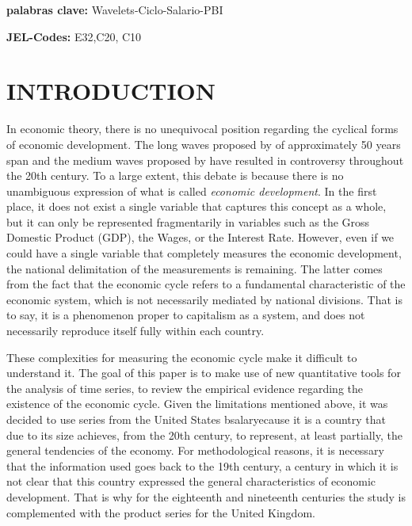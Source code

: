 \documentclass[a4paper,10cpi]{article}
\begin{document}
	
	\textbf{palabras clave:} Wavelets-Ciclo-Salario-PBI
	
	\textbf{JEL-Codes:} E32,C20, C10
	
	
	
	\pagebreak
	
	
	\section{\uppercase{\textbf{\normalsize{Introduction}}}}
	
	In economic theory, there is no unequivocal position regarding the cyclical forms of economic development. The long waves proposed by \cite{kondratieff1979long} of approximately 50 years span and the medium waves proposed by \cite{kuznets1930secular} have resulted in controversy throughout the 20th century. To a large extent, this debate is because there is no unambiguous expression of what is called \textit{economic development}. In the first place, it does not exist a single variable that captures this concept as a whole, but it can only be represented fragmentarily in variables such as the Gross Domestic Product (GDP), the Wages, or the Interest Rate. However, even if we could have a single variable that completely measures the economic development, the national delimitation of the measurements is remaining. The latter comes from the fact that the economic cycle refers to a fundamental characteristic of the economic system, which is not necessarily mediated by national divisions. That is to say, it is a phenomenon proper to capitalism as a system, and does not necessarily reproduce itself fully within each country.
	
	
	These complexities for measuring the economic cycle make it difficult to understand it. The goal of this paper is to make use of new quantitative tools for the analysis of time series, to review the empirical evidence regarding the existence of the economic cycle. Given the limitations mentioned above, it was decided to use series from the United States bsalaryecause it is a country that due to its size achieves, from the 20th century, to represent, at least partially, the general tendencies of the economy. For methodological reasons, it is necessary that the information used goes back to the 19th century, a century in which it is not clear that this country expressed the general characteristics of economic development. That is why for the eighteenth and nineteenth centuries the study is complemented with the product series for the United Kingdom.
	
\end{document}
